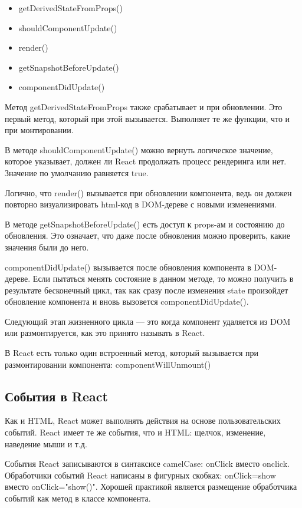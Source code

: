 \documentclass[14pt, a4paper]{diplom}
\begin{document}
\begin{itemize}
\item getDerivedStateFromProps()
\item shouldComponentUpdate()
\item render()
\item getSnapshotBeforeUpdate()
\item componentDidUpdate()
\end{itemize}

Метод getDerivedStateFromProps также срабатывает и при обновлении. Это первый метод, который при этой вызывается.
Выполняет те же функции, что и при монтировании.

В методе shouldComponentUpdate() можно вернуть логическое значение, которое указывает, должен ли React продолжать процесс рендеринга или нет.
Значение по умолчанию равняется true.

Логично, что render() вызывается при обновлении компонента, ведь он должен повторно визуализировать html-код в DOM-дереве с новыми изменениями.

В методе getSnapshotBeforeUpdate() есть доступ к props-ам и состоянию до обновления. Это означает, что даже после обновления можно проверить, какие значения были до него.

componentDidUpdate() вызывается после обновления компонента в DOM-дереве. Если пытаться менять состояние в данном методе, то можно получить в результате бесконечный цикл, так как сразу после изменения state произойдет обновление компонента и вновь вызовется componentDidUpdate().

Следующий этап жизненного цикла — это когда компонент удаляется из DOM или размонтируется, как это принято называть в React.

В React есть только один встроенный метод, который вызывается при размонтировании компонента: componentWillUnmount()

\subsection{События в React}

Как и HTML, React может выполнять действия на основе пользовательских событий.
React имеет те же события, что и HTML: щелчок, изменение, наведение мыши и т.д.

События React записываются в синтаксисе camelCase:
onClick вместо onclick.
Обработчики событий React написаны в фигурных скобках:
onClick={show} вместо onClick="show()".
Хорошей практикой является размещение обработчика событий как метод в классе компонента.
\end{document}
